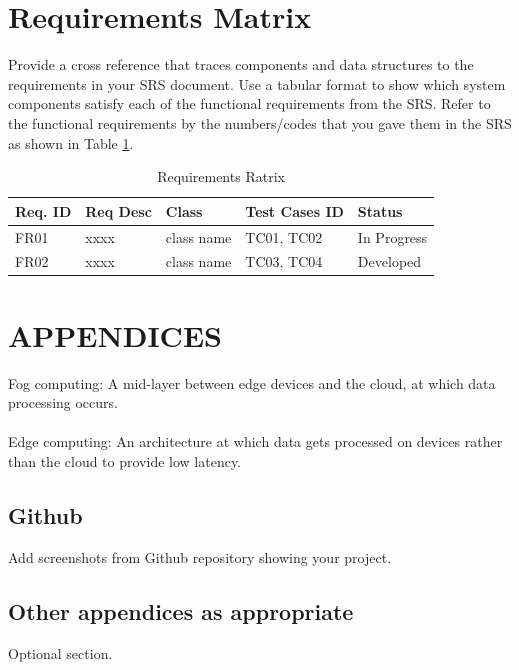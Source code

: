 \documentclass[12pt]{article}
\begin{document}
\section{Requirements Matrix}
Provide a cross reference that traces components and data structures to the requirements in your SRS document.
Use  a  tabular  format to show  which system  components satisfy each of the  functional 
requirements from the SRS. Refer to the functional requirements by the numbers/codes that you gave them in the SRS as shown in Table \ref{tab:RM}.

\begin{table}[htbp]
\centering
\caption{Requirements Ratrix}
\label{tab:RM}
\begin{tabular}{|l|l|l|l|l|}
\hline
Req. ID  & Req Desc & Class & Test Cases ID & Status      \\ \hline
FR01     & xxxx     & class name & TC01, TC02    & In Progress \\ \hline
FR02     & xxxx     & class name & TC03, TC04    & Developed   \\ \hline
\end{tabular}
\end{table}

\section{APPENDICES}
Fog computing: A mid-layer between edge devices and the cloud, at which data processing occurs. 
\\
\\
Edge computing: An architecture at which data gets processed on devices rather than the cloud to provide low latency.

\subsection{Github}
Add screenshots from Github repository showing your project.

\subsection{ Other appendices as appropriate}
Optional section.

\printbibliography
\end{document}

